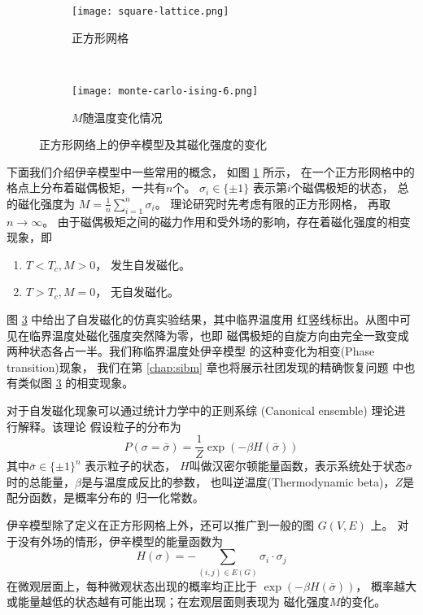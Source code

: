 \begin{figure}
	\centering
	\begin{subfigure}{0.45\textwidth}
		\texttt{[image: square-lattice.png]}
		\caption{正方形网格}\label{fig:square_lattice}
	\end{subfigure}~
	\begin{subfigure}{0.53\textwidth}
		\texttt{[image: monte-carlo-ising-6.png]}
		\caption{$M$随温度变化情况}\label{fig:square_lattice_b}
	\end{subfigure}
  \caption{正方形网络上的伊辛模型及其磁化强度的变化}
\end{figure}

下面我们介绍伊辛模型中一些常用的概念，
如图 \ref{fig:square_lattice} 所示，
在一个正方形网格中的格点上分布着磁偶极矩，一共有$n$个。
$\sigma_i \in \{ \pm 1\} $ 表示第$i$个磁偶极矩的状态，
总的磁化强度为 $M = \frac{1}{n} \sum_{i=1}^n \sigma_i$。
理论研究时先考虑有限的正方形网格， 再取 $n\to \infty$。
由于磁偶极矩之间的磁力作用和受外场的影响，存在着磁化强度的相变现象，即
\begin{enumerate}
		\item $T< T_c, M>0$， 发生自发磁化。
		\item $T> T_c, M=0$， 无自发磁化。
\end{enumerate}

图 \ref{fig:square_lattice_b} 中给出了自发磁化的仿真实验结果，其中临界温度用
红竖线标出。从图中可见在临界温度处磁化强度突然降为零，也即
磁偶极矩的自旋方向由完全一致变成两种状态各占一半。我们称临界温度处伊辛模型
的这种变化为相变(Phase transition)现象，
我们在第 \ref{chap:sibm} 章也将展示社团发现的精确恢复问题
中也有类似图 \ref{fig:square_lattice_b} 的相变现象。

对于自发磁化现象可以通过统计力学中的正则系综 (Canonical ensemble)
理论进行解释。该理论
假设粒子的分布为
\begin{equation}\label{eq:canonical_ensemble}
P(\sigma = \bar{\sigma}) = \frac{1}{Z} \exp(-\beta H(\bar{\sigma}))
\end{equation}
其中$\bar{\sigma} \in \{\pm 1\}^n$ 表示粒子的状态，
$H$叫做汉密尔顿能量函数，表示系统处于状态$\bar{\sigma}$时的总能量，$\beta$是与温度成反比的参数，
也叫逆温度(Thermodynamic beta)，$Z$是配分函数，是概率分布的
归一化常数。


伊辛模型除了定义在正方形网格上外，还可以推广到一般的图 $G(V, E)$ 上。
对于没有外场的情形，伊辛模型的能量函数为
\begin{equation}\label{eq:hamiltonian}
	H(\sigma) = -\sum_{(i,j) \in E(G)} \sigma_i \cdot \sigma_j
\end{equation}
在微观层面上，每种微观状态出现的概率均正比于 $\exp(-\beta H(\bar{\sigma}))$，
概率越大或能量越低的状态越有可能出现；在宏观层面则表现为
磁化强度$M$的变化。

